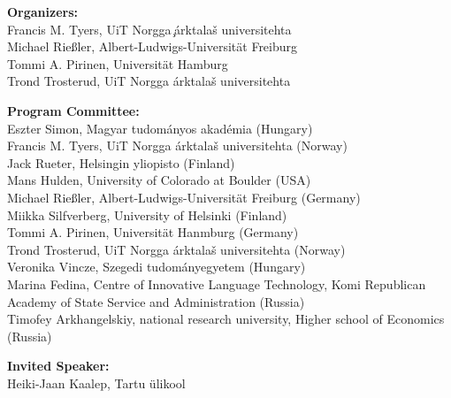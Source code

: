 \documentclass[11pt]{article}
\begin{document}

\vspace*{0.5cm}


\begin{description}
\item{\bf Organizers: }\vspace{2mm} \\
Francis M. Tyers, UiT Norgga ̧\'arktala\v{s} universitehta\\
Michael Rie{\ss}ler, Albert-Ludwigs-Universit\"at Freiburg\\
Tommi A. Pirinen, Universit\"at Hamburg\\
Trond Trosterud, UiT Norgga \'arktala\v{s} universitehta

\vspace{3mm}
\item{\bf Program Committee:}\vspace{2mm} \\
    Eszter Simon, Magyar tudom\'anyos akad\'emia (Hungary) \\
    Francis M. Tyers, UiT Norgga \'arktala\v{s} universitehta (Norway) \\
    Jack Rueter, Helsingin yliopisto (Finland) \\
    Mans Hulden, University of Colorado at Boulder (USA) \\
    Michael Rie{\ss}ler, Albert-Ludwigs-Universit\"at Freiburg (Germany) \\
    Miikka Silfverberg, University of Helsinki (Finland) \\
    Tommi A. Pirinen, Universit\"at Hanmburg (Germany) \\
    Trond Trosterud, UiT Norgga \'arktala\v{s} universitehta (Norway) \\
    Veronika Vincze, Szegedi tudom\'anyegyetem (Hungary) \\
    Marina Fedina,
    Centre of Innovative Language Technology,
    Komi Republican Academy of State Service and Administration (Russia) \\
    Timofey Arkhangelskiy, national research university, Higher school of
    Economics (Russia)

\vspace{3mm}
\item{\bf Invited Speaker:}\vspace{2mm} \\
    Heiki-Jaan Kaalep, Tartu \"ulikool



\end{description}
\end{document}
